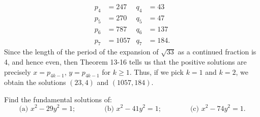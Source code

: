 \begin{solution}
\begin{enumerate}
\begin{align*}
            p_4 &= 247 & q_4 &= 43 \\
            p_5 &= 270 & q_5 &= 47 \\
            p_6 &= 787 & q_6 &= 137 \\
            p_7 &= 1057 & q_7 &= 184.
        \end{align*}
        Since the length of the period of the expansion of $\sqrt{33}$ as a continued fraction is 4, and hence even, then Theorem 13-16 tells us that the positive solutions are precisely $x = p_{4k-1}$, $y = p_{4k-1}$ for $k \geq 1$. Thus, if we pick $k = 1$ and $k = 2$, we obtain the solutions $(23,4)$ and $(1057, 184)$. \\
    \end{enumerate}
\end{solution}

\begin{exercise}
    Find the fundamental solutions of:
    $$\text{(a) } x^2 - 29y^2 = 1; \qquad \qquad \text{(b) } x^2 - 41y^2 = 1; \qquad \qquad \text{(c) } x^2 - 74y^2 = 1.$$
     \\
\end{exercise}

